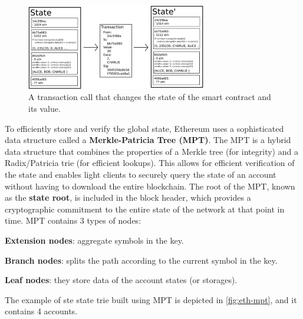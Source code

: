 \begin{figure}[t]
	\begin{center}
		\includegraphics[width=0.7\textwidth]{./figs/eth-state-change.png}
		\caption{A transaction call that changes the state of the smart contract and its value.}		
		\label{fig:eth-state-change}
	\end{center}	
\end{figure}


To efficiently store and verify the global state, Ethereum uses a
sophisticated data structure called a \textbf{Merkle-Patricia Tree
	(MPT)}. The MPT is a hybrid data structure that combines the properties
of a Merkle tree (for integrity) and a Radix/Patricia trie (for
efficient lookups). This allows for efficient verification of the state
and enables light clients to securely query the state of an account
without having to download the entire blockchain. The root of the MPT,
known as the \textbf{state root}, is included in the block header, which
provides a cryptographic commitment to the entire state of the network
at that point in time.
MPT contains 3 types of nodes:
\begin{compactenum}
	\item \textbf{Extension nodes}: aggregate symbols in the key.
	\item \textbf{Branch nodes}: splits the path according to the current symbol in the key.
	\item \textbf{Leaf nodes}: they store data of the account states (or storages).	
\end{compactenum}
The example of ste state trie built using MPT is depicted in \autoref{fig:eth-mpt}, and it contains 4 accounts.


